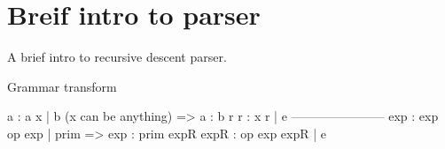 \section{Breif intro to parser}

A brief intro to recursive descent parser.

Grammar transform

  \begin{bluetext}
    a : a x | b (x can be anything)
    =>
    a : b r
    r : x r | e
    -----------------------
    exp : exp op exp | prim
    =>
    exp : prim expR
    expR : op exp expR | e 
  \end{bluetext}

